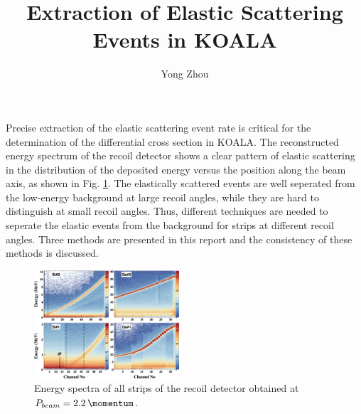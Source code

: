 \documentclass[fleqn,twocolumn,a4paper]{ikpar}
\begin{document}
\parindent=0pt
\frenchspacing

\title{{\bf
    Extraction of Elastic Scattering Events in KOALA
}}
\author{Yong Zhou
}

\maketitle

Precise extraction of the elastic scattering event rate is critical for the
determination of the differential cross section in KOALA.
The reconstructed energy spectrum of the recoil detector shows a clear pattern of
elastic scattering in the distribution of the deposited energy versus the position along the beam axis, as shown in Fig. \ref{fig:energy_vs_strips}.
The elastically scattered events are well seperated from the low-energy background at large
recoil angles, while they are hard to distinguish at small recoil angles.
Thus, different techniques are needed to seperate the elastic events from the
background for strips at different recoil angles.
Three methods are presented in this report and the consistency of these methods is discussed.
\begin{figure}[b!]
	\includegraphics[width=0.48\textwidth]{./energy_vs_strips.png}
  \caption{Energy spectra of all strips of the recoil detector obtained at
    $P_{beam} = \SI{2.2}{\momentum}$.}
  \label{fig:energy_vs_strips}
\end{figure}

\par
\medskip
\end{document}
